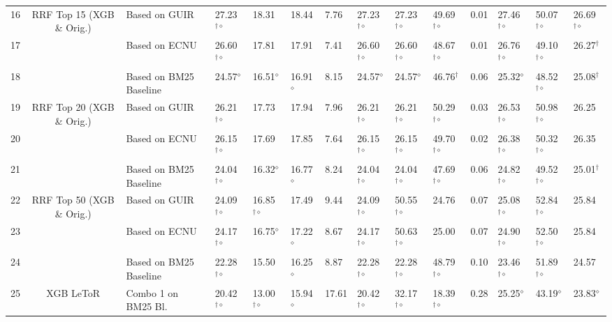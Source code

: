 \begin{table*}
{\begin{tabular}{ccllllllllllll}
\midrule 
16  & \multirow{3}{*}{RRF Top 15 (XGB \& Orig.) }  & Based on GUIR  & 27.23$^{\dagger\diamond}$  & 18.31  & 18.44  & 7.76 & 27.23$^{\dagger\diamond}$  & 27.23$^{\dagger\diamond}$  & 49.69$^{\dagger\diamond}$  & 0.01  & 27.46$^{\dagger\diamond}$  & 50.07$^{\dagger\diamond}$  & 26.69$^{\dagger\diamond}$\tabularnewline
17  &  & Based on ECNU  & 26.60$^{\dagger\diamond}$  & 17.81  & 17.91  & 7.41 & 26.60$^{\dagger\diamond}$  & 26.60$^{\dagger\diamond}$  & 48.67$^{\dagger\diamond}$  & 0.01  & 26.76$^{\dagger\diamond}$  & 49.10$^{\dagger\diamond}$  & 26.27$^{\dagger}$ \tabularnewline
18  &  & Based on BM25 Baseline  & 24.57$^{\diamond}$  & 16.51$^{\diamond}$  & 16.91$^{\diamond}$  & 8.15 & 24.57$^{\diamond}$  & 24.57$^{\diamond}$  & 46.76$^{\dagger}$  & 0.06  & 25.32$^{\diamond}$  & 48.52$^{\dagger\diamond}$  & 25.08$^{\dagger}$ \tabularnewline
\midrule 
19  & \multirow{3}{*}{RRF Top 20 (XGB \& Orig.)}  & Based on GUIR  & 26.21$^{\dagger\diamond}$  & 17.73  & 17.94  & 7.96 & 26.21$^{\dagger\diamond}$  & 26.21$^{\dagger\diamond}$  & 50.29$^{\dagger\diamond}$  & 0.03  & 26.53$^{\dagger\diamond}$  & 50.98$^{\dagger\diamond}$  & 26.25\tabularnewline
20  &  & Based on ECNU  & 26.15$^{\dagger\diamond}$  & 17.69  & 17.85  & 7.64 & 26.15$^{\dagger\diamond}$  & 26.15$^{\dagger\diamond}$  & 49.70$^{\dagger\diamond}$  & 0.02  & 26.38$^{\dagger\diamond}$  & 50.32$^{\dagger\diamond}$  & 26.35\tabularnewline
21  &  & Based on BM25 Baseline  & 24.04$^{\dagger\diamond}$  & 16.32$^{\diamond}$  & 16.77$^{\diamond}$  & 8.24 & 24.04$^{\dagger\diamond}$  & 24.04$^{\dagger\diamond}$  & 47.69$^{\dagger\diamond}$  & 0.06  & 24.82$^{\dagger\diamond}$  & 49.52$^{\dagger\diamond}$  & 25.01$^{\dagger}$ \tabularnewline
\midrule 
22  & \multirow{3}{*}{RRF Top 50 (XGB \& Orig.)}  & Based on GUIR  & 24.09$^{\dagger\diamond}$  & 16.85$^{\dagger\diamond}$  & 17.49  & 9.44 & 24.09$^{\dagger\diamond}$  & 50.55$^{\dagger\diamond}$  & 24.76  & 0.07  & 25.08$^{\dagger\diamond}$  & 52.84$^{\dagger\diamond}$  & 25.84\tabularnewline
23  &  & Based on ECNU  & 24.17$^{\dagger\diamond}$  & 16.75$^{\diamond}$  & 17.22$^{\diamond}$  & 8.67 & 24.17$^{\dagger\diamond}$  & 50.63$^{\dagger\diamond}$  & 25.00  & 0.07  & 24.90$^{\dagger\diamond}$  & 52.50$^{\dagger\diamond}$  & 25.84 \tabularnewline
24  &  & Based on BM25 Baseline  & 22.28$^{\dagger\diamond}$  & 15.50  & 16.25$^{\diamond}$  & 8.87 & 22.28$^{\dagger\diamond}$  & 22.28$^{\dagger\diamond}$  & 48.79$^{\dagger\diamond}$  & 0.10  & 23.46$^{\dagger\diamond}$  & 51.89$^{\dagger\diamond}$  & 24.57\tabularnewline
\midrule 
25  & \multirow{5}{*}{XGB LeToR}  & Combo 1 on BM25 Bl.  & 20.42$^{\dagger\diamond}$  & 13.00$^{\dagger\diamond}$  & 15.94$^{\diamond}$  & 17.61 & 20.42$^{\dagger\diamond}$  & 32.17$^{\dagger\diamond}$  & 18.39$^{\dagger\diamond}$  & 0.28  & 25.25$^{\diamond}$  & 43.19$^{\diamond}$  & 23.83$^{\diamond}$\tabularnewline

\end{tabular}}
\end{table*}
